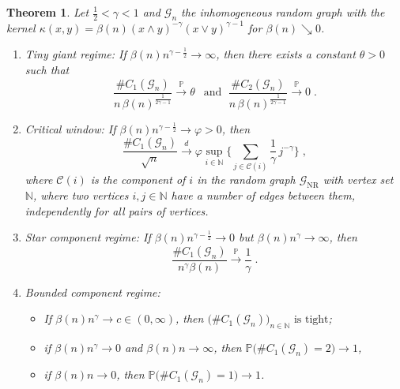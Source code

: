 \documentclass[12pt,a4paper]{article}
\numberwithin{equation}{section}
\newtheorem{theorem}{Theorem}
\begin{document}
\begin{theorem} \label{main}
 Let $\tfrac12 <\gamma <1$ 
 and $\mathscr G_n$ the inhomogeneous random graph with the kernel 
 $\kappa(x,y)=\beta(n) (x\wedge y)^{-\gamma}(x\vee y)^{\gamma-1}$
 for $\beta(n)\searrow0$.
 \begin{enumerate}
     \item[(I)] \emph{Tiny giant regime}: If 
     $\beta(n)n^{\gamma-\tfrac{1}{2}}\to \infty$, then there exists a constant $\theta>0$ 
     such that 
     $$\displaystyle \frac{\#C_1(\mathscr{G}_n)}{n\,\beta(n)^{\frac{1}{2\gamma-1}}}  \overset{\mathbb P}{\longrightarrow } \theta \,\;\text{ and }\;\frac{\#C_2(\mathscr{G}_n)}{n\,\beta(n)^{\frac{1}{2\gamma-1
}}}  \overset{\mathbb P}{\longrightarrow }0 \;.$$
     \item[(II)] \emph{Critical window}: If $\beta(n)n^{\gamma-\tfrac{1}{2}}\to \varphi >0 $, then
     $$ \displaystyle\frac{\# C_1(\mathscr{G}_n)}{\sqrt{n}}  \overset{d}{\longrightarrow} \varphi \sup_{i\in\mathbb N}\bigg\{\sum_{j\in\mathcal C(i)} \frac{1}{\gamma}\, j^{-\gamma}\bigg\}\;,$$
     where $\mathcal{C}(i)$ is the component of $i$ in the random graph
     $\mathscr{G}_{\text{NR}}$ with vertex set $\mathbb N$, where two vertices $i,j\in\mathbb N$ have a  number of edges between them, independently for all pairs of vertices.
     
     \item[(III)] \emph{Star component regime}: If  
    $\beta(n)n^{\gamma-\tfrac{1}{2}}\to 0$  but $\beta(n)n^{\gamma}\to\infty$, 
     then
     $$
      \frac{\#C_1(\mathscr G_n)}{n^\gamma \beta(n)} \overset{\mathbb P}{\longrightarrow} \frac{1}{\gamma} \;.
     $$
 \item[(IV)]  \emph{Bounded component regime}: 
 \begin{itemize}
     \item[(i)]
 If $\beta(n)n^{\gamma}\to c\in(0,\infty)$, then
     $ \big(\#C_1(\mathscr{G}_n)\big)_{n\in\mathbb N} \text{ is tight}$; 
     \smallskip
  \item[(ii)] if $\beta(n)n^{\gamma}\to 0$ and $\beta(n)n\to\infty$, then
     $ \mathbb P \big(\#C_1(\mathscr{G}_n)= 2\big)\to 1$,\smallskip
   \item[(iii)]  if $\beta(n)n\to0$, then  $ \mathbb P \big(\#C_1(\mathscr{G}_n)=1\big)\to 1$.
     \end{itemize}
 \end{enumerate}
\pagebreak[3]
\end{theorem} 
\end{document}
